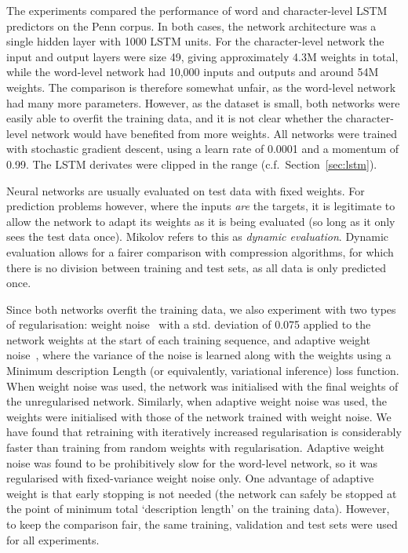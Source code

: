 \documentclass{article}
\newcommand{\cf}{c.f.\ }
\newcommand{\sref}[1]{Section~\ref{sec:#1}}
\begin{document}
The experiments compared the performance of word and character-level LSTM predictors on the Penn corpus.
In both cases, the network architecture was a single hidden layer with 1000 LSTM units.
For the character-level network the input and output layers were size 49, giving approximately 4.3M weights in total, while the word-level network had 10,000 inputs and outputs and around 54M weights.
The comparison is therefore somewhat unfair, as the word-level network had many more parameters.
However, as the dataset is small, both networks were easily able to overfit the training data, and it is not clear whether the character-level network would have benefited from more weights.
All networks were trained with stochastic gradient descent, using a learn rate of 0.0001 and a momentum of 0.99.
The LSTM derivates were clipped in the range  (\cf \sref{lstm}).

Neural networks are usually evaluated on test data with fixed weights.
For prediction problems however, where the inputs \emph{are} the targets, it is legitimate to allow the network to adapt its weights as it is being evaluated (so long as it only sees the test data once).
Mikolov refers to this as \emph{dynamic evaluation}.
Dynamic evaluation allows for a fairer comparison with compression algorithms, for which there is no division between training and test sets, as all data is only predicted once.

Since both networks overfit the training data, we also experiment with two types of regularisation: weight noise~\cite{chuen96noise} with a std. deviation of 0.075 applied to the network weights at the start of each training sequence, and adaptive weight noise~\cite{graves11nips}, where the variance of the noise is learned along with the weights using a Minimum description Length (or equivalently, variational inference) loss function.
When weight noise was used, the network was initialised with the final weights of the unregularised network.
Similarly, when adaptive weight noise was used, the weights were initialised with those of the network trained with weight noise.
We have found that retraining with iteratively increased regularisation is considerably faster than  training from random weights with regularisation.
Adaptive weight noise was found to be prohibitively slow for the word-level network, so it was regularised with fixed-variance weight noise only.
One advantage of adaptive weight is that early stopping is not needed (the network can safely be stopped at the point of minimum total `description length' on the training data). 
However, to keep the comparison fair, the same training, validation and test sets were used for all experiments.
\end{document}
